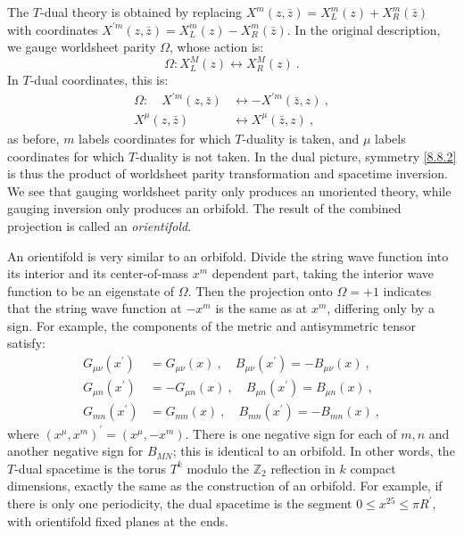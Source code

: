 The $T$-dual theory is obtained by replacing $X^{m}(z, \bar{z})=X_{L}^{m}(z)+X_{R}^{m}(\bar{z})$ with coordinates $X^{\prime m}(z, \bar{z})= X_{L}^{m}(z)-X_{R}^{m}(\bar{z})$. 
In the original description, we gauge worldsheet parity $\Omega$, whose action is:
\begin{equation}
	\Omega: X_{L}^{M}(z) \leftrightarrow X_{R}^{M}(z) \:. \label{8.8.1}
\end{equation}
In $T$-dual coordinates, this is:
\begin{subequations} \label{8.8.2}
	\begin{align}
		\Omega: \quad X^{\prime m}(z, \bar{z})  &\leftrightarrow-X^{\prime m}(\bar{z}, z) \:, \label{8.8.2a} \\
		X^{\mu}(z, \bar{z})  &\leftrightarrow X^{\mu}(\bar{z}, z) \:, \label{8.8.2b}
	\end{align}
\end{subequations}
as before, $m$ labels coordinates for which $T$-duality is taken, and $\mu$ labels coordinates for which $T$-duality is not taken. 
In the dual picture, symmetry \eqref{8.8.2} is thus the product of worldsheet parity transformation and spacetime inversion. 
We see that gauging worldsheet parity only produces an unoriented theory, while gauging inversion only produces an orbifold. The result of the combined projection is called an \emph{orientifold}.

An orientifold is very similar to an orbifold. Divide the string wave function into its interior and its center-of-mass $x^{m}$ dependent part, taking the interior wave function to be an eigenstate of $\Omega$. 
Then the projection onto $\Omega=+1$ indicates that the string wave function at $-x^{m}$ is the same as at $x^{m}$, differing only by a sign. 
For example, the components of the metric and antisymmetric tensor satisfy:
\begin{subequations} \label{8.8.3}
	\begin{align}
		G_{\mu \nu}(x^{\prime}) &= G_{\mu \nu}(x) \:, \quad  B_{\mu \nu}(x^{\prime})=-B_{\mu \nu}(x) \:, \label{8.8.3a} \\ 	
		G_{\mu n}(x^{\prime}) & =-G_{\mu n}(x) \:, \quad  B_{\mu n}(x^{\prime})=B_{\mu n}(x) 	\:, \label{8.8.3b} \\
		G_{m n}(x^{\prime}) &= G_{m n}(x) \:, \quad  B_{m n}(x^{\prime})=-B_{m n}(x) \:, \label{8.8.3c}
	\end{align}
\end{subequations}
where $(x^{\mu}, x^{m})^{\prime} = (x^{\mu},-x^{m})$. 
There is one negative sign for each of $m, n$ and another negative sign for $B_{M N}$; this is identical to an orbifold. 
In other words, the $T$-dual spacetime is the torus $T^{k}$ modulo the $\mathds{Z}_{2}$ reflection in $k$ compact dimensions, exactly the same as the construction of an orbifold. 
For example, if there is only one periodicity, the dual spacetime is the segment $0 \leq x^{25} \leq \pi R^{\prime}$, with orientifold fixed planes at the ends.

